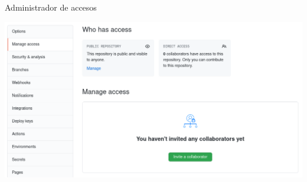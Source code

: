 \begin{frame}[c]{Administrador de accesos}
    \begin{center}
        \includegraphics[scale=0.3]{img/github-manage-access.png}
    \end{center}
\end{frame}
